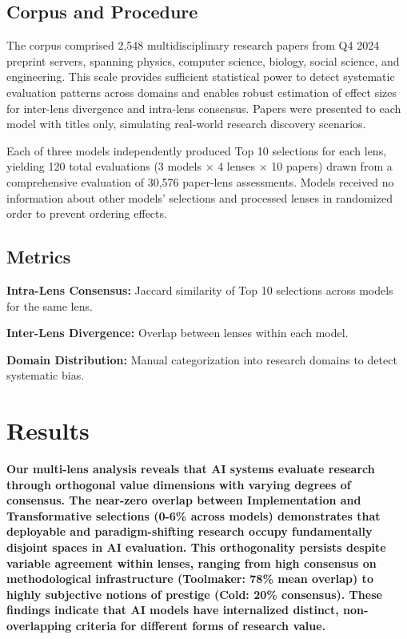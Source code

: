 \documentclass{article}
\begin{document}
\subsection{Corpus and Procedure}

The corpus comprised 2,548 multidisciplinary research papers from Q4 2024 preprint servers, spanning physics, computer science, biology, social science, and engineering. This scale provides sufficient statistical power to detect systematic evaluation patterns across domains and enables robust estimation of effect sizes for inter-lens divergence and intra-lens consensus. Papers were presented to each model with titles only, simulating real-world research discovery scenarios.

Each of three models independently produced Top 10 selections for each lens, yielding 120 total evaluations (3 models × 4 lenses × 10 papers) drawn from a comprehensive evaluation of 30,576 paper-lens assessments. Models received no information about other models' selections and processed lenses in randomized order to prevent ordering effects.

\subsection{Metrics}

\textbf{Intra-Lens Consensus:} Jaccard similarity of Top 10 selections across models for the same lens.

\textbf{Inter-Lens Divergence:} Overlap between lenses within each model.

\textbf{Domain Distribution:} Manual categorization into research domains to detect systematic bias.

\section{Results}

\textbf{Our multi-lens analysis reveals that AI systems evaluate research through orthogonal value dimensions with varying degrees of consensus. The near-zero overlap between Implementation and Transformative selections (0-6\% across models) demonstrates that deployable and paradigm-shifting research occupy fundamentally disjoint spaces in AI evaluation. This orthogonality persists despite variable agreement within lenses, ranging from high consensus on methodological infrastructure (Toolmaker: 78\% mean overlap) to highly subjective notions of prestige (Cold: 20\% consensus). These findings indicate that AI models have internalized distinct, non-overlapping criteria for different forms of research value.}
\end{document}
